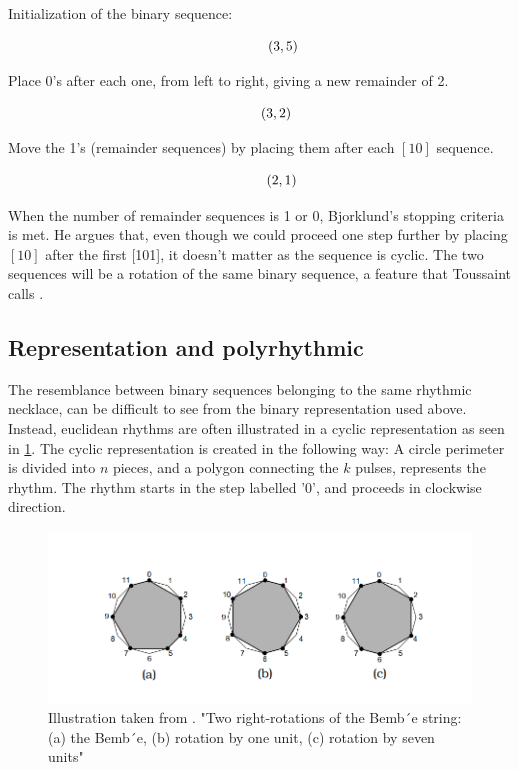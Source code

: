 Initialization of the binary sequence:

\begin{equation*}
[1][1][1][1][1][0][0][0] \hspace{0.1\textwidth} (3,5)
\end{equation*}

Place 0's after each one, from left to right, giving a new remainder of 2. 

\begin{equation*}
    [10][10][10][1][1] \hspace{0.07\textwidth} (3,2)
\end{equation*}

Move the 1's (remainder sequences) by placing them after each $[10]$ sequence. 

\begin{equation*}
    [101][101][10] \hspace{0.095\textwidth} (2,1)
\end{equation*}

When the number of remainder sequences is 1 or 0, Bjorklund's stopping criteria is met. He argues that, even though we could proceed one step further by placing $[10]$ after the first [101], it doesn't matter as the sequence is cyclic. The two sequences will be a rotation of the same binary sequence, a feature that Toussaint calls \cite{Toussaint2005TheEA}.

\subsection{Representation and polyrhythmic}
\label{sec:polyrhythmic}
The resemblance between binary sequences belonging to the same rhythmic necklace, can be difficult to see from the binary representation used above. Instead, euclidean rhythms are often illustrated in a cyclic representation as seen in \cref{fig:euclid_rot}\cite{Toussaint2005TheEA}. The cyclic representation is created in the following way: A circle perimeter is divided into $n$ pieces, and a polygon connecting the $k$ pulses, represents the rhythm. The rhythm starts in the step labelled '0', and proceeds in clockwise direction.

\begin{figure}[H]
    \centering
    \includegraphics[width=\textwidth]{graphics/euclid_rotation}
    \caption{Illustration taken from \cite{Toussaint2005TheEA}. "Two right-rotations of the Bemb´e string: (a) the Bemb´e, (b) rotation by one unit, (c) rotation by
seven units"}
    \label{fig:euclid_rot}
\end{figure}

